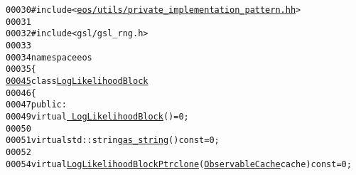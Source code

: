 \begin{footnotesize}
\begin{alltt}
00030 \textcolor{preprocessor}{#include <\hyperlink{private__implementation__pattern_8hh}{eos/utils/private_implementation_pattern.hh}>}
00031 
00032 \textcolor{preprocessor}{#include <gsl/gsl\_rng.h>}
00033 
00034 \textcolor{keyword}{namespace }eos
00035 \{
\hypertarget{log__likelihood_8hh_source_l00045}{}\hyperlink{classeos_1_1LogLikelihoodBlock}{00045}     \textcolor{keyword}{class }\hyperlink{classeos_1_1LogLikelihoodBlock}{LogLikelihoodBlock}
00046     \{
00047         \textcolor{keyword}{public}:
00049             \textcolor{keyword}{virtual} \hyperlink{classeos_1_1LogLikelihoodBlock_a0217895e8d4cf8b69c3086b28ae152a1}{~LogLikelihoodBlock}() = 0;
00050 
00051             \textcolor{keyword}{virtual} std::string \hyperlink{classeos_1_1LogLikelihoodBlock_ad99b9336fdbb4c28eedc50b18d3c60c3}{as_string}() \textcolor{keyword}{const} = 0;
00052 
00054             \textcolor{keyword}{virtual} \hyperlink{namespaceeos_ab823a6782e060c440e05a614158ad1bf}{LogLikelihoodBlockPtr} \hyperlink{classeos_1_1LogLikelihoodBlock_a950a255f78736f75b2458e48c30e119f}{clone}(\hyperlink{classeos_1_1ObservableCache}{ObservableCache} cache) \textcolor{keyword}{const} = 0;
      

\end{alltt}
\end{footnotesize}
